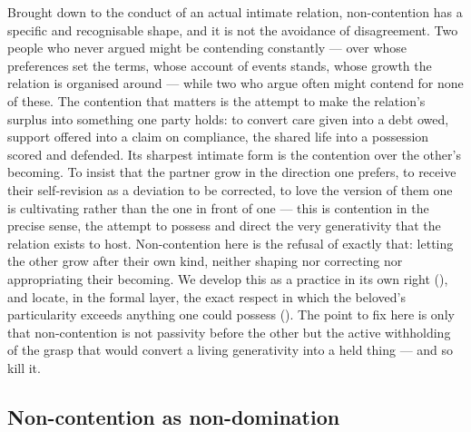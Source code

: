 Brought down to the conduct of an actual intimate relation, non-contention has a specific and recognisable shape, and it is not the avoidance of disagreement. Two people who never argued might be contending constantly --- over whose preferences set the terms, whose account of events stands, whose growth the relation is organised around --- while two who argue often might contend for none of these. The contention that matters is the attempt to make the relation's surplus into something one party holds: to convert care given into a debt owed, support offered into a claim on compliance, the shared life into a possession scored and defended. Its sharpest intimate form is the contention over the other's becoming. To insist that the partner grow in the direction one prefers, to receive their self-revision as a deviation to be corrected, to love the version of them one is cultivating rather than the one in front of one --- this is contention in the precise sense, the attempt to possess and direct the very generativity that the relation exists to host. Non-contention here is the refusal of exactly that: letting the other grow after their own kind, neither shaping nor correcting nor appropriating their becoming. We develop this as a practice in its own right (), and locate, in the formal layer, the exact respect in which the beloved's particularity exceeds anything one could possess (). The point to fix here is only that non-contention is not passivity before the other but the active withholding of the grasp that would convert a living generativity into a held thing --- and so kill it.

\subsection{Non-contention as non-domination}
\label{p20:sub:noncon-pettit}

